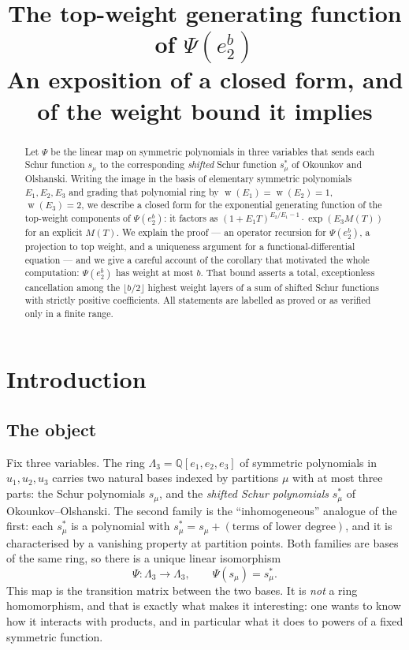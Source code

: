 \documentclass[10pt]{article}
\title{\bf The top-weight generating function of $\Psi(e_2^b)$\\[2pt]
\large An exposition of a closed form, and of the weight bound it implies}
\author{}
\date{}
\theoremstyle{plain}
\theoremstyle{definition}
\newcommand{\bbQ}{\mathbb{Q}}
\newcommand{\Lam}{\Lambda_3}
\newcommand{\wt}{\operatorname{w}}
\begin{document}
\maketitle
\vspace{-2.2em}

\begin{abstract}
\noindent Let $\Psi$ be the linear map on symmetric polynomials in three variables that sends each
Schur function $s_\mu$ to the corresponding \emph{shifted} Schur function $s^*_\mu$ of
Okounkov and Olshanski. Writing the image in the basis of elementary symmetric polynomials
$E_1,E_2,E_3$ and grading that polynomial ring by $\wt(E_1)=\wt(E_2)=1$, $\wt(E_3)=2$, we
describe a closed form for the exponential generating function of the top-weight components of
$\Psi(e_2^b)$: it factors as $(1+E_1T)^{E_2/E_1-1}\cdot\exp(E_3M(T))$ for an explicit
$M(T)$. We explain the proof --- an operator recursion for $\Psi(e_2^b)$, a projection to top
weight, and a uniqueness argument for a functional-differential equation --- and we give a
careful account of the corollary that motivated the whole computation: $\Psi(e_2^b)$ has
weight at most $b$. That bound asserts a total, exceptionless cancellation among the
$\lfloor b/2\rfloor$ highest weight layers of a sum of shifted Schur functions with strictly
positive coefficients. All statements are labelled as proved or as verified only in a finite
range.
\end{abstract}

\section{Introduction}

\subsection*{The object}

Fix three variables. The ring $\Lam=\bbQ[e_1,e_2,e_3]$ of symmetric polynomials in
$u_1,u_2,u_3$ carries two natural bases indexed by partitions $\mu$ with at most three
parts: the Schur polynomials $s_\mu$, and the \emph{shifted Schur polynomials} $s^*_\mu$ of
Okounkov--Olshanski. The second family is the ``inhomogeneous'' analogue of the first: each
$s^*_\mu$ is a polynomial with $s^*_\mu = s_\mu + (\text{terms of lower degree})$, and it is
characterised by a vanishing property at partition points. Both families are bases of the
same ring, so there is a unique linear isomorphism
\[
  \Psi:\Lam \longrightarrow \Lam,\qquad \Psi(s_\mu)=s^*_\mu .
\]
This map is the transition matrix between the two bases. It is \emph{not} a ring homomorphism,
and that is exactly what makes it interesting: one wants to know how it interacts with
products, and in particular what it does to powers of a fixed symmetric function.
\end{document}
